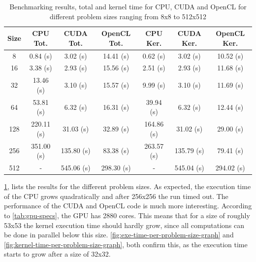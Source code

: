 \documentclass[final]{report}
\begin{document}
\begin{table}[H]
	\centering
	\caption{Benchmarking results, total and kernel time for CPU, CUDA and OpenCL for different problem sizes ranging from 8x8 to 512x512}
	\label{tab:results-problem-size}
	\begin{tabular}{ccccccc}
		\toprule
			\textbf{Size}		& \textbf{CPU Tot.}	& \textbf{CUDA Tot.}	& \textbf{OpenCL Tot.}	& \textbf{CPU Ker.}	& \textbf{CUDA Ker.}	& \textbf{OpenCL Ker.}\\
		\midrule
			8					& 0.84 (s)			& 3.02 (s)				& 14.41 (s)				& 0.62 (s)			& 3.02 (s)				& 10.52 (s) \\
			16					& 3.38 (s)			& 2.93 (s)				& 15.56 (s)				& 2.51 (s)			& 2.93 (s)				& 11.68 (s) \\
			32					& 13.46 (s)			& 3.10 (s)				& 15.57 (s)				& 9.99 (s)			& 3.10 (s)				& 11.69 (s) \\
			64					& 53.81 (s)			& 6.32 (s)				& 16.31 (s)				& 39.94 (s)			& 6.32 (s)				& 12.44 (s) \\
			128					& 220.11 (s)		& 31.03 (s)				& 32.89 (s)				& 164.86 (s)		& 31.02 (s)				& 29.00 (s) \\
			256					& 351.00 (s)		& 135.80 (s)			& 83.38 (s)				& 263.57 (s)		& 135.79 (s)			& 79.41 (s) \\
			512					& -					& 545.06 (s)			& 298.30 (s)				& -					& 545.04 (s)				& 294.02 (s) \\
		\bottomrule
	\end{tabular}
\end{table}

\cref{tab:results-problem-size}, lists the results for the different problem sizes.
As expected, the execution time of the CPU grows quadratically and after 256x256 the run timed out. 
The performance of the CUDA and OpenCL code is much more interesting.
According to \cref{tab:gpu-specs}, the GPU has 2880 cores.
This means that for a size of roughly 53x53 the kernel execution time should hardly grow, since all computations can be done in parallel below this size.
\cref{fig:exe-time-per-problem-size-graph} and \cref{fig:kernel-time-per-problem-size-graph}, both confirm this, as the execution time starts to grow after a size of 32x32.
\end{document}
